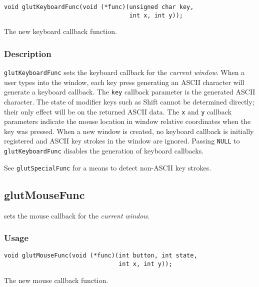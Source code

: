 \begin{verbatim}
void glutKeyboardFunc(void (*func)(unsigned char key,
                                   int x, int y));
\end{verbatim}
\begin{description}
\itemsep 0in
\item[\tt func]
The new keyboard callback function.
\end{description}

\subsubsection*{Description}

{\tt glutKeyboardFunc} sets the keyboard callback for the {\em current window}.
When a user types into the window, each key press generating an ASCII character
will generate a keyboard callback.  The {\tt key} callback parameter is the 
generated ASCII character.  The state of modifier keys such as Shift cannot be
determined directly; their only effect will be on the returned ASCII data.
The {\tt x} and {\tt y} callback
parameters indicate the mouse location in window relative coordinates
when the key was pressed.  When a new window is created, no keyboard
callback is initially registered and ASCII key strokes in the window are
ignored.  
Passing {\tt NULL} to {\tt glutKeyboardFunc} disables
the generation of keyboard callbacks.

See {\tt glutSpecialFunc} for a means to detect non-ASCII key strokes.

\subsection{glutMouseFunc}

 sets the mouse callback for the {\em current window}.

\subsubsection*{Usage}

\begin{verbatim}
void glutMouseFunc(void (*func)(int button, int state,
                                int x, int y));
\end{verbatim}
\begin{description}
\itemsep 0in
\item[\tt func]
The new mouse callback function.
\end{description}

